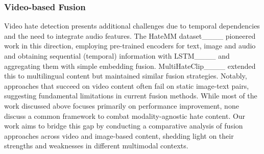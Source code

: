\subsubsection{Video-based Fusion}
Video hate detection presents additional challenges due to temporal dependencies and the need to integrate audio features. The HateMM dataset____ pioneered work in this direction, employing pre-trained encoders for text, image and audio and obtaining sequential (temporal) information with LSTM____ and aggregating them with simple embedding fusion. MultiHateClip____ extended this to multilingual content but maintained similar fusion strategies. Notably, approaches that succeed on video content often fail on static image-text pairs, suggesting fundamental limitations in current fusion methods. While most of the work discussed above focuses primarily on performance improvement, none discuss a common framework to combat modality-agnostic hate content. Our work aims to bridge this gap by conducting a comparative analysis of fusion approaches across video and image-based content, shedding light on their strengths and weaknesses in different multimodal contexts.

